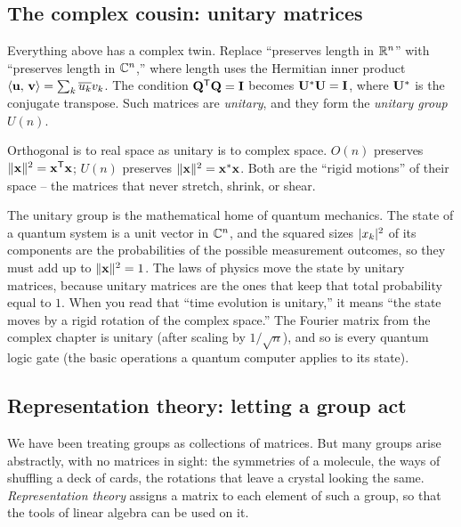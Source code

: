 \subsection{The complex cousin: unitary matrices}
\label{ch37:unitary}

Everything above has a complex twin. Replace ``preserves length in $\mathbb{R}^n$'' with
``preserves length in $\mathbb{C}^n$,'' where length uses the Hermitian inner product
$\langle \mathbf{u},\, \mathbf{v} \rangle = \sum_k \overline{u_k} v_k$. The condition
$\mathbf{Q}^{\mathsf{T}}\mathbf{Q}=\mathbf{I}$ becomes $\mathbf{U}^{*}\mathbf{U}=\mathbf{I}$, where $\mathbf{U}^{*}$
is the conjugate transpose. Such matrices are \emph{unitary}, and they form the
\emph{unitary group} $U(n)$.

\begin{focusbox}
Orthogonal is to real space as unitary is to complex space. $O(n)$ preserves
$\lVert\mathbf{x}\rVert^2 = \mathbf{x}^{\mathsf{T}}\mathbf{x}$; $U(n)$ preserves $\lVert\mathbf{x}\rVert^2 =
\mathbf{x}^{*}\mathbf{x}$. Both are the ``rigid motions'' of their space -- the matrices
that never stretch, shrink, or shear.
\end{focusbox}

The unitary group is the mathematical home of quantum mechanics. The state of a
quantum system is a unit vector in $\mathbb{C}^n$, and the squared sizes $\lvert x_k\rvert^2$ of its
components are the probabilities of the possible measurement outcomes, so they must
add up to $\lVert\mathbf{x}\rVert^2=1$. The laws of physics move the state by
unitary matrices, because unitary matrices are the ones that keep that
total probability equal to $1$. When you read that ``time
evolution is unitary,'' it means ``the state moves by a rigid rotation of the complex
space.'' The Fourier matrix from the complex chapter is unitary (after
scaling by $1/\sqrt{n}$), and so is every quantum logic gate (the basic operations a
quantum computer applies to its state).

\subsection{Representation theory: letting a group act}
\label{ch37:reps}

We have been treating groups as collections of matrices. But many groups arise
abstractly, with no matrices in sight: the symmetries of a molecule, the ways of
shuffling a deck of cards, the rotations that leave a crystal looking the same.
\emph{Representation theory} assigns a matrix to each element of such a group, so
that the tools of linear algebra can be used on it.

